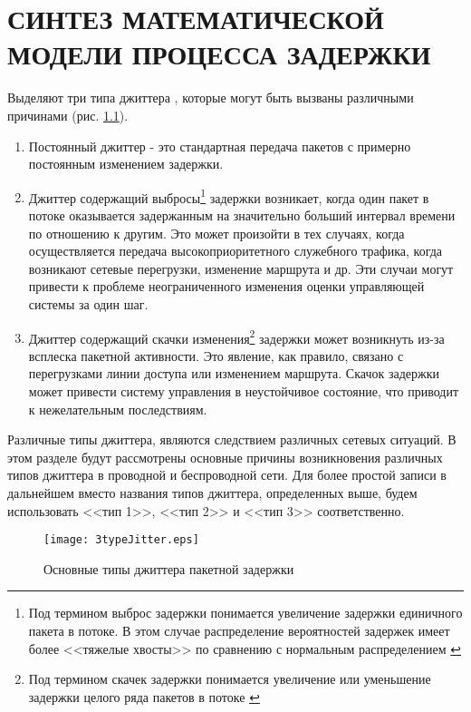 \chapter{СИНТЕЗ МАТЕМАТИЧЕСКОЙ МОДЕЛИ ПРОЦЕССА ЗАДЕРЖКИ} \label{chapt:model}
Выделяют три типа джиттера \cite{clark}, которые могут быть вызваны различными причинами (рис. \ref{img:3typeJitter}).
\begin{enumerate}
  \item Постоянный джиттер - это стандартная передача пакетов с примерно постоянным изменением задержки.
  \item Джиттер содержащий выбросы\footnote{Под термином выброс задержки понимается увеличение задержки единичного пакета в потоке. В этом случае распределение вероятностей задержек имеет более <<тяжелые хвосты>>  по сравнению с нормальным распределением \cite{Klekis} } задержки возникает, когда один пакет в потоке оказывается задержанным на значительно больший интервал времени по отношению к другим. Это может произойти в тех случаях, когда осуществляется передача высокоприоритетного служебного трафика, когда возникают сетевые перегрузки, изменение маршрута и др. Эти случаи могут привести к проблеме неограниченного изменения оценки управляющей системы за один шаг.
  \item Джиттер содержащий скачки изменения\footnote{Под термином скачек задержки понимается увеличение или уменьшение задержки целого ряда пакетов в потоке \cite{clark} } задержки может возникнуть из-за всплеска пакетной активности. Это явление, как правило, связано с перегрузками линии доступа или изменением маршрута. Скачок задержки может привести систему управления в неустойчивое состояние, что приводит к нежелательным последствиям.
\end{enumerate}


Различные типы джиттера, являются следствием различных сетевых ситуаций. В этом разделе будут рассмотрены основные причины возникновения различных типов джиттера в проводной и беспроводной сети. Для более простой записи в дальнейшем вместо названия типов джиттера, определенных выше, будем использовать <<тип 1>>, <<тип 2>> и <<тип 3>> соответственно.

\begin{figure} [!h] 
  \center
\texttt{[image: 3typeJitter.eps]}
  \caption{Основные типы джиттера пакетной задержки} 
  \label{img:3typeJitter}  
\end{figure}


